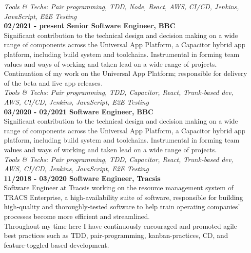 \emph{Tools \& Techs: Pair programming, TDD, Node, React, AWS, CI/CD, Jenkins, JavaScript, E2E Testing}\\

\textbf{02/2021 - present \hspace{2.75em}Senior Software Engineer, BBC}\\

Significant contribution to the technical design and decision making on a wide range of components across the Universal App Platform, a Capacitor hybrid app platform, including build system and toolchains. Instrumental in forming team values and ways of working and taken lead on a wide range of projects.\\

Continuation of my work on the Universal App Platform; responsible for delivery of the beta and live app releases.\\

\emph{Tools \& Techs: Pair programming, TDD, Capacitor, React, Trunk-based dev, AWS, CI/CD, Jenkins, JavaScript, E2E Testing}\\

\textbf{03/2020 - 02/2021 \hspace{2.75em}Software Engineer, BBC}\\

Significant contribution to the technical design and decision making on a wide range of components across the Universal App Platform, a Capacitor hybrid app platform, including build system and toolchains. Instrumental in forming team values and ways of working and taken lead on a wide range of projects.\\

\emph{Tools \& Techs: Pair programming, TDD, Capacitor, React, Trunk-based dev, AWS, CI/CD, Jenkins, JavaScript, E2E Testing}\\

\textbf{11/2018 - 03/2020 \hspace{2.75em}Software Engineer, Tracsis}\\

Software Engineer at Tracsis working on the resource management system of TRACS Enterprise, a high-availability suite of software, responsible for building high-quality and thoroughly-tested software to help train operating companies' processes become more efficient and streamlined.\\

Throughout my time here I have continuously encouraged and promoted agile best practices such as TDD, pair-programming, kanban-practices, CD, and feature-toggled based development.\\

